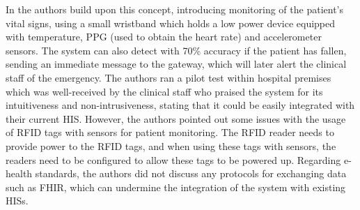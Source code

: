 % 

In \cite{Adame2018} the authors build upon this concept, introducing monitoring of the patient's vital signs, using a small wristband which holds a low power device equipped with temperature, \acs{PPG} (used to obtain the heart rate) and accelerometer sensors. The system can also detect with 70\% accuracy if the patient has fallen, sending an immediate message to the gateway, which will later alert the clinical staff of the emergency. The authors ran a pilot test within hospital premises which was well-received by the clinical staff who praised the system for its intuitiveness and non-intrusiveness, stating that it could be easily integrated with their current \acs{HIS}. However, the authors pointed out some issues with the usage of \acs{RFID} tags with sensors for patient monitoring. The \acs{RFID} reader needs to provide power to the \acs{RFID} tags, and when using these tags with sensors, the readers need to be configured to allow these tags to be powered up. Regarding e-health standards, the authors did not discuss any protocols for exchanging data such as \acs{FHIR}, which can undermine the integration of the system with existing \acs{HIS}s.

%

